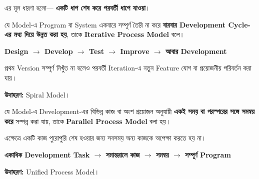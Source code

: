 এর মূল ধারণা হলো—
\textbf{একটি ধাপ শেষ করে পরবর্তী ধাপে যাওয়া}।


\begin{definitionbox}

যে Model-এ Program বা System একবারে সম্পূর্ণ তৈরি না করে
\textbf{বারবার Development Cycle-এর মধ্য দিয়ে উন্নত করা হয়},
তাকে \textbf{Iterative Process Model} বলে।

\end{definitionbox}

\begin{center}

\textbf{
Design
\(\rightarrow\)
Develop
\(\rightarrow\)
Test
\(\rightarrow\)
Improve
\(\rightarrow\)
আবার Development
}

\end{center}

প্রথম Version সম্পূর্ণ নিখুঁত না হলেও পরবর্তী Iteration-এ
নতুন Feature যোগ বা প্রয়োজনীয় পরিবর্তন করা যায়।

\textbf{উদাহরণ:} Spiral Model।


\begin{definitionbox}

যে Model-এ Development-এর বিভিন্ন কাজ বা অংশ প্রয়োজন অনুযায়ী
\textbf{একই সময় বা পরস্পরের সঙ্গে সমন্বয় করে} সম্পন্ন করা যায়,
তাকে \textbf{Parallel Process Model} বলা হয়।

\end{definitionbox}

এক্ষেত্রে একটি কাজ পুরোপুরি শেষ হওয়ার জন্য সবসময় অন্য কাজকে
অপেক্ষা করতে হয় না।

\begin{center}

\textbf{
একাধিক Development Task
\(\longrightarrow\)
সমান্তরালে কাজ
\(\longrightarrow\)
সমন্বয়
\(\longrightarrow\)
সম্পূর্ণ Program
}

\end{center}

\textbf{উদাহরণ:} Unified Process Model।


